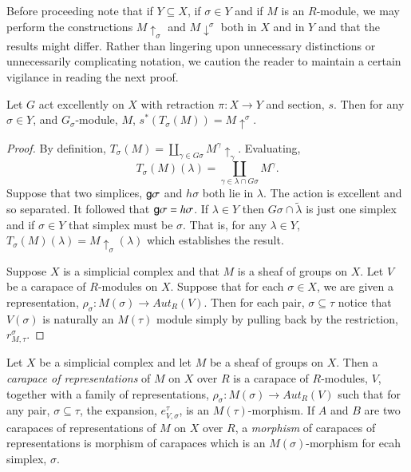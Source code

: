 Before proceeding note that if $Y \subseteq X$, if $\sigma \in Y$ and if $M$ is an $R$-module, we may perform the constructions $M \uparrow_{\sigma}$ and $M \downarrow^{\sigma}$ both in $X$ and in $Y$ and that the results might differ. Rather than lingering upon unnecessary distinctions or unnecessarily complicating notation, we caution the reader to maintain a certain vigilance in reading the next proof.

\begin{lem}\label{art6-lemma-9.9}
Let $G$ act excellently on $X$ with retraction $\pi : X\rightarrow Y$ and section, $s$. Then for any $\sigma \in Y$, and $G_{\sigma}$-module, $M$, $s^{*}(T_{\sigma}(M)) = M \uparrow^{\sigma}$.
\end{lem}

\begin{proof}
By definition, $T_{\sigma}(M) = \coprod_{\gamma \in G\sigma}M^{\gamma} \uparrow_{\gamma}$. Evaluating,
$$
T_{\sigma}(M)(\lambda) = \coprod_{\gamma \in \lambda \cap G{\sigma}} M^{\gamma}.
$$
Suppose that two simplices, $\mathsf{g} \sigma$ and $h\sigma$ both  lie in $\lambda$. The action is excellent and so separated. It followed that $\mathsf{g} \sigma = h \sigma$. If $\lambda \in Y$ then $G\sigma \cap \tilde{\lambda}$ is just one simplex and if $\sigma \in Y$ that simplex must be $\sigma$. That is, for any $\lambda \in Y$, $T_{\sigma}(M)(\lambda) = M\uparrow_{\sigma}(\lambda)$ which establishes the result.

Suppose $X$ is a simplicial complex and that $M$ is a sheaf of groups on $X$. Let $V$ be a carapace of $R$-modules on $X$. Suppose that for each $\sigma \in X$, we are given a representation, $\rho_{\sigma}:M(\sigma) \rightarrow Aut_{R}(V)$. Then for each pair,  $\sigma \subseteq \tau$ notice that $V(\sigma)$ is naturally an $M(\tau)$ module simply by pulling back by the restriction, $r_{M, \tau}^{\sigma}$.
\end{proof}

\begin{definition}\label{art6-definition-9.10}
Let $X$ be a simplicial complex and let $M$ be a sheaf of groups on $X$. Then a \textit{carapace of representations} of $M$ on $X$ over $R$ is a carapace of $R$-modules, $V$, together with a family of representations, $\rho_{\sigma}: M(\sigma) \rightarrow Aut_{R}(V)$ such that for any pair, $\sigma \subseteq \tau$, the expansion, $e_{V, \sigma}^{\tau}$, is an $M(\tau)$-morphism. If $A$ and $B$ are two carapaces of representations of $M$ on $X$ over $R$, a \textit{morphism} of carapaces of representations is morphism of carapaces which is an $M(\sigma)$-morphism for ecah simplex, $\sigma$.
\end{definition}

